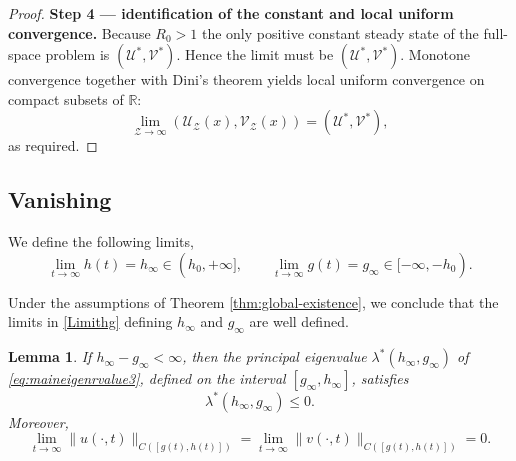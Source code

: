 \documentclass[a4paper,11pt]{amsart}
\newtheorem{lemma}[theorem]{Lemma}
\theoremstyle{definition}
\numberwithin{equation}{section}
\theoremstyle{definition}
\begin{document}
\begin{proof}
\medskip\noindent\textbf{Step 4 — identification of the constant and local uniform convergence.}
Because \(R_0>1\) the only positive constant steady state of the full-space problem is \( (\mathscr{U}^\ast, \mathscr{V}^\ast)\). Hence the limit must be \((\mathscr{U}^\ast, \mathscr{V}^\ast)\). Monotone convergence together with Dini's theorem yields local uniform convergence on compact subsets of \(\mathbb R\):
\[
\lim_{\mathcal Z\to\infty} (\mathscr{U}_{\mathcal Z}(x), \mathscr{V}_{\mathcal Z}(x))=(\mathscr{U}^\ast, \mathscr{V}^\ast),
\]
as required.
\end{proof}

\subsection{Vanishing}
We define the following limits,
\begin{equation}\label{Limithg}
\lim_{t \to \infty} h(t) = h_{\infty} \in (h_{0}, +\infty],
\qquad
\lim_{t \to \infty} g(t) = g_{\infty} \in [-\infty, -h_{0}).
\end{equation}

Under the assumptions of Theorem \eqref{thm:global-existence}, we conclude that the limits in \eqref{Limithg} defining $h_{\infty}$ and $g_{\infty}$ are well defined.



\begin{lemma}\label{lem:vanishing}
If $h_\infty - g_\infty < \infty$, then the principal eigenvalue
$\lambda^\ast(h_\infty, g_\infty)$ of \eqref{eq:maineigenrvalue3}, defined on the interval
$[g_\infty, h_\infty]$, satisfies
\[
\lambda^\ast(h_\infty, g_\infty) \leq 0.
\]
Moreover,
\[
\lim_{t \to \infty} \|u(\cdot, t)\|_{C([g(t),h(t)])}
= \lim_{t \to \infty} \|v(\cdot, t)\|_{C([g(t),h(t)])} = 0.
\]
\end{lemma}
\end{document}
